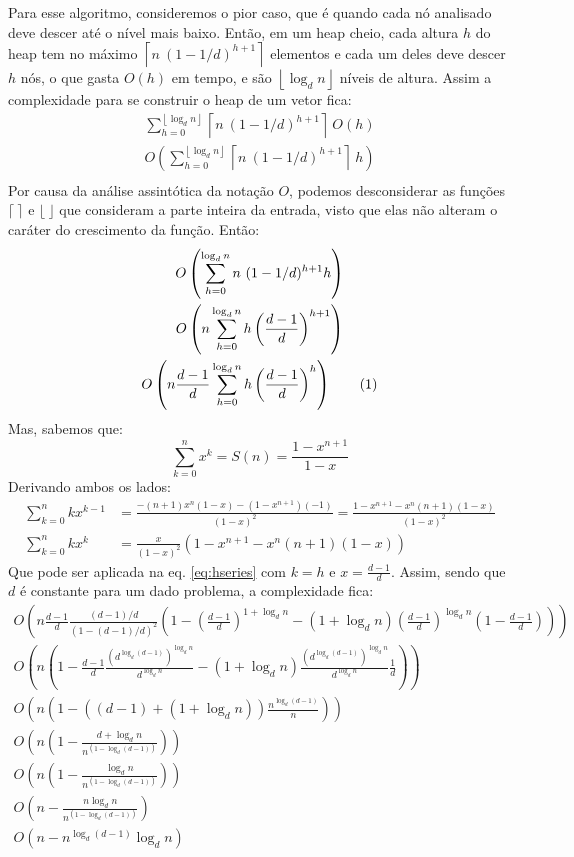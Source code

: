 Para esse algoritmo, consideremos o pior caso, que é quando cada nó analisado deve
descer até o nível mais baixo. Então, em um heap cheio, cada altura $h$ do heap tem no máximo
$\left\lceil n\ (1 - 1/d)^{h+1}\right\rceil$ elementos e cada um deles deve descer $h$ nós,
o que gasta $O(h)$ em tempo, e são $\left\lfloor\log_d n\right\rfloor$ níveis de altura. Assim a complexidade
para se construir o heap de um vetor fica:
\begin{gather*}
    \sum_{h = 0}^{\left\lfloor\log_d n\right\rfloor} \left\lceil n\ (1 - 1/d)^{h+1}\right\rceil\ O(h) \\
    O\left( \sum_{h = 0}^{\left\lfloor\log_d n\right\rfloor} \left\lceil n\ (1 - 1/d)^{h+1}\right\rceil\ h\right) \\
\end{gather*}
Por causa da análise assintótica da notação $O$, podemos desconsiderar as funções $\lceil\ \rceil$ e $\lfloor\ \rfloor$
que consideram a parte inteira da entrada, visto que elas não alteram o caráter do crescimento da função. Então:
\begin{gather*}
    O\left(\sum_{h = 0}^{\log_d n} n\ (1 - 1/d)^{h+1} h\right) \\
    O\left(n \sum_{h = 0}^{\log_d n} h \left(\frac{d - 1}{d}\right)^{h+1}\right) \\
    O\left(n \frac{d-1}{d} \sum_{h = 0}^{\log_d n} h \left(\frac{d - 1}{d}\right)^h\right) \addtocounter{equation}{1}\tag{\theequation} \label{eq:hseries}
\end{gather*}
Mas, sabemos que:
$$\sum_{k = 0}^n x^k = S(n) =\frac{1-x^{n+1}}{1-x}$$
Derivando ambos os lados:
\begin{align*}
    \sum_{k = 0}^n k x^{k-1} &= \frac{-(n+1)x^n(1-x)-(1-x^{n+1})(-1)}{(1-x)^2} = \frac{1-x^{n+1}-x^n(n+1)(1-x)}{(1-x)^2} \\
    \sum_{k = 0}^n k x^k &= \frac{x}{(1-x)^2} (1-x^{n+1}-x^n(n+1)(1-x))
\end{align*}
Que pode ser aplicada na eq. \eqref{eq:hseries} com $k = h$ e $x = \frac{d-1}{d}$. Assim, sendo que $d$ é constante para
um dado problema, a complexidade fica:
\begin{gather*}
    O\left(n \frac{d-1}{d} \frac{(d-1)/d}{(1-(d-1)/d)^2} \left(1-\left(\frac{d-1}{d}\right)^{1+\log_d n}-(1+\log_d n)\left(\frac{d-1}{d}\right)^{\log_d n}\left(1-\frac{d-1}{d}\right)\right)\right) \\
    O\left(n \left(1-\frac{d-1}{d} \frac{(d^{\log_d (d-1)})^{\log_d n}}{d^{\log_d n}}-(1+\log_d n)\frac{(d^{\log_d (d-1)})^{\log_d n}}{d^{\log_d n}}\frac{1}{d}\right)\right) \\
    O\left(n \left(1-((d-1)+(1+\log_d n))\frac{n^{\log_d (d-1)}}{n}\right)\right) \\
    O\left(n \left(1-\frac{d+\log_d n}{n^{(1-\log_d (d-1))}}\right)\right) \\
    O\left(n \left(1-\frac{\log_d n}{n^{(1-\log_d (d-1))}}\right)\right) \\
    O\left(n-\frac{n \log_d n}{n^{(1-\log_d (d-1))}}\right) \\
    O\left(n-n^{\log_d (d-1)}\log_d n\right)
\end{gather*}
